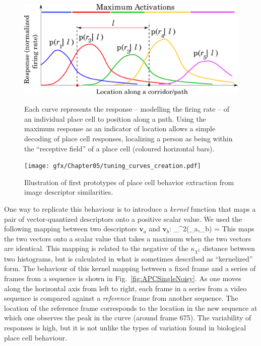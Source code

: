\begin{figure}
\includegraphics[width=\textwidth]{gfx/Chapter05/APCResponses.pdf}
\label{fig:APC}
\caption{Each curve represents the response -- modelling the firing rate -- of an individual place cell to position along a path. Using the maximum response as an indicator of location allows a simple decoding of place cell responses, localizing a person as being within the ``receptive field'' of a place cell (coloured horizontal bars).}
\end{figure}


\begin{figure}
\texttt{[image: gfx/Chapter05/tuning\_curves\_creation.pdf]}
\caption{Illustration of first prototypes of place cell behavior extraction from image descriptor similarities.}
\label{fig:creatingAPCs}
\end{figure}

One way to replicate this behaviour is to introduce a {\it kernel} function that maps a pair of vector-quantized descriptors onto a positive scalar value. We used the following mapping between two descriptors $\mathbf{v}_a$ and $\mathbf{v}_b$:
\be
\centering
\kappa_{\chi^2}(_a,_b) = 
\ee
This maps the two vectors onto a scalar value that takes a maximum when the two vectors are identical.  This mapping is related to the negative of the $\kappa_{\chi^2}$ distance between two histograms, but is calculated in what is sometimes described as ``kernelized'' form. The behaviour of this kernel mapping between a fixed frame and a series of frames from a sequence is shown in Fig.~\ref{fig:APCSingleNoisy}.  As one moves along the horizontal axis from left to right, each frame in a series from a video sequence is compared against a {\em reference} frame from another sequence.  The location of the reference frame corresponds to the location in the new sequence at which one observes the peak in the curve (around frame 675).  The variability of responses is high, but it is not unlike the types of variation found in biological place cell behaviour.  

